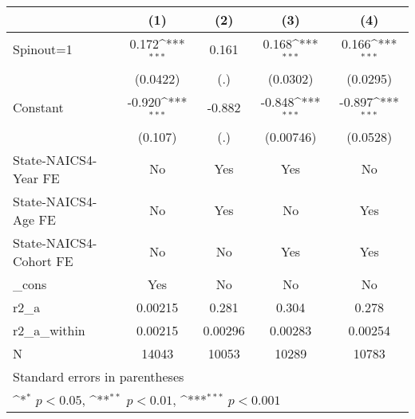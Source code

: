 {
\def\sym#1{\ifmmode^{#1}\else\(^{#1}\)\fi}
\begin{tabular}{l*{4}{c}}
\hline\hline
                    &\multicolumn{1}{c}{(1)}         &\multicolumn{1}{c}{(2)}         &\multicolumn{1}{c}{(3)}         &\multicolumn{1}{c}{(4)}         \\
\hline
Spinout=1           &       0.172\sym{***}&       0.161         &       0.168\sym{***}&       0.166\sym{***}\\
                    &    (0.0422)         &         (.)         &    (0.0302)         &    (0.0295)         \\
[1em]
Constant            &      -0.920\sym{***}&      -0.882         &      -0.848\sym{***}&      -0.897\sym{***}\\
                    &     (0.107)         &         (.)         &   (0.00746)         &    (0.0528)         \\
[1em]
State-NAICS4-Year FE&          No         &         Yes         &         Yes         &          No         \\
[1em]
State-NAICS4-Age FE &          No         &         Yes         &          No         &         Yes         \\
[1em]
State-NAICS4-Cohort FE&          No         &          No         &         Yes         &         Yes         \\
[1em]
\_cons              &         Yes         &          No         &          No         &          No         \\
\hline
r2\_a                &     0.00215         &       0.281         &       0.304         &       0.278         \\
r2\_a\_within         &     0.00215         &     0.00296         &     0.00283         &     0.00254         \\
N                   &       14043         &       10053         &       10289         &       10783         \\
\hline\hline
\multicolumn{5}{l}{\footnotesize Standard errors in parentheses}\\
\multicolumn{5}{l}{\footnotesize \sym{*} \(p<0.05\), \sym{**} \(p<0.01\), \sym{***} \(p<0.001\)}\\
\end{tabular}
}
